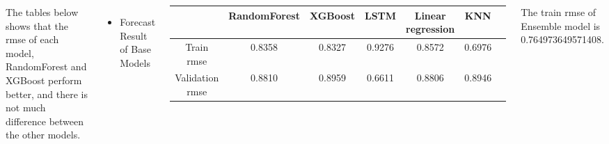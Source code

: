 \documentclass{tikzposter} %
\begin{document}
\begin{columns}
		
		
		
		
		
		
		{
			The tables below shows that the rmse of 
			each model, RandomForest and XGBoost 
			perform better, and there is not much 
			difference between the other models.
			\vspace{.4cm}
			\begin{itemize}
				\item Forecast Result of Base Models
			\end{itemize}
			\vspace{.5cm}
			\begin{center}
				\begin{tabular}{ccccccc}
					\toprule
					& RandomForest & XGBoost & LSTM & Linear regression & KNN\\
					\midrule
					Train rmse & 0.8358 & 0.8327 & 0.9276 & 0.8572 & 0.6976\\
					Validation rmse & 0.8810 & 0.8959 & 0.6611 & 0.8806 & 
					0.8946\\
					\bottomrule
				\end{tabular}
			\end{center}
			\vspace{.5cm}
			The train rmse of Ensemble model is 0.764973649571408.
			
}
\end{columns}
\end{document}
